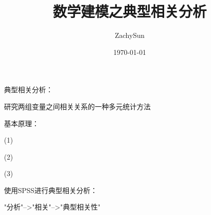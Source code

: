 \documentclass{article}
\title{数学建模之典型相关分析}
\date{\today}
\author{ZachySun}
\begin{document}
\maketitle
典型相关分析：

研究两组变量之间相关关系的一种多元统计方法

基本原理：

(1)

(2)

(3)

使用SPSS进行典型相关分析：

"分析"-->"相关"-->"典型相关性"
\end{document}
